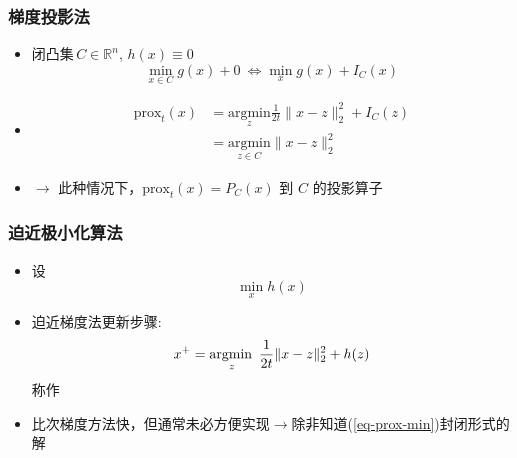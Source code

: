 \documentclass[handout]{beamer}
\begin{document}
\begin{frame}

\frametitle{梯度投影法 \mystar}
\begin{itemize}
	\item 
闭凸集\,$C \in \mathbb{R}^{n}$, $h(x)\equiv 0 $
\begin{equation}
\min _{x \in C} g(x) +0 \ \Longleftrightarrow \min _{x} g(x)+I_{C}(x)
\end{equation}

\item  
\begin{equation}
\begin{aligned}
\text{prox}_{t}(x) &=\underset{z}{\text{argmin}} \frac{1}{2 t}\|x-z\|_{2}^{2}+I_{C}(z) \\
&=\underset{z \in C}{\text{argmin}}\|x-z\|_{2}^{2}
\end{aligned}
\end{equation}

\item 

$\rightarrow$ 此种情况下，$\text{prox}_{t}(x)=P_{C}(x)$ 到 $C$
的投影算子



\end{itemize}
\end{frame}
\begin{frame}

\frametitle{迫近极小化算法}

\begin{itemize}
	\item 
设 
\begin{equation}
\min _{x} h(x)
\end{equation}
 
 \item 
迫近梯度法更新步骤:
\begin{equation}\label{eq-prox-min}
x^{+}=\underset{z}{\textnormal{argmin}\,}\ \frac{1}{2 t}\|x-z\|_{2}^{2}+h(z)
\end{equation}
称作 

\item 
比次梯度方法快，但通常未必方便实现$\rightarrow$除非知道(\ref{eq-prox-min})封闭形式的解

\end{itemize}
\end{frame}
\end{document}
